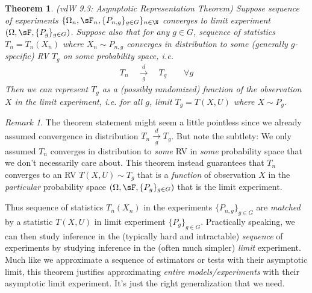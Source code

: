 \documentclass[12pt]{article}
\theoremstyle{plain}
\newtheorem{thm}{Theorem}[section]
\theoremstyle{definition}
\theoremstyle{remark}
\newtheorem*{rmk}{Remark}
\newcommand{\dto}{\xrightarrow{d}}
\begin{document}
\begin{thm}
\emph{(vdW 9.3: Asymptotic Representation Theorem)}
\label{thm:limitexp}
Suppose sequence of experiments
$\{\Omega_n,\sF_n,\{P_{n,g}\}_{g\in G}\}_{n\in\N}$
converges to limit experiment
$(\Omega,\sF,\{P_{g}\}_{g\in G})$.
Suppose also that for any $g\in G$, sequence of statistics
$T_n=T_n(X_n)$ where $X_n\sim P_{n,g}$ converges in distribution to
\emph{some} (generally $g$-specific) RV $T_g$ on some probability space,
i.e.
\begin{align*}
  T_n \quad\underset{g}{\dto}\quad T_g
  \qquad
  \forall g
\end{align*}
Then we can represent $T_g$ as a (possibly randomized) function of the
observation $X$ in the limit experiment, i.e.
for all $g$, limit $T_g = T(X,U)$ where $X\sim P_g$.
\end{thm}
\begin{rmk}
The theorem statement might seem a little pointless since we already
assumed convergence in distribution $T_n\underset{g}{\dto} T_g$.
But note the subtlety: We only assumed $T_n$ converges in distribution
to \emph{some} RV in \emph{some} probability space that we don't
necessarily care about. This theorem instead guarantees that $T_n$
converges to an RV $T(X,U){\sim} T_g$ that is a \emph{function} of
observation $X$ in the \emph{particular} probability space
$(\Omega,\sF,\{P_g\}_{g\in G})$ that is the limit experiment.

Thus sequence of statistics $T_n(X_n)$ in the experiments
$\{P_{n,g}\}_{g\in G}$ are \emph{matched} by a statistic $T(X,U)$ in
limit experiment $\{P_{g}\}_{g\in G}$.
Practically speaking, we can then study inference in the (typically hard
and intractable) \emph{sequence} of experiments by studying inference in
the (often much simpler) \emph{limit} experiment.
Much like we approximate a sequence of estimators or tests with their
asymptotic limit, this theorem justifies approximating
\emph{entire models/experiments} with their asymptotic limit experiment.
It's just the right generalization that we need.
\end{rmk}
\end{document}
